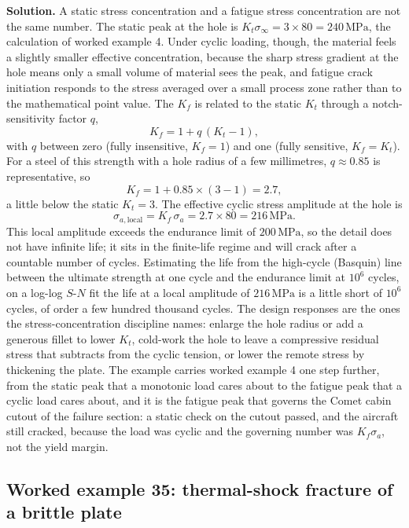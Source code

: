 \textbf{Solution.} A static stress concentration and a fatigue stress
concentration are not the same number. The static peak at the hole is
$K_t\sigma_\infty = 3\times 80 = 240\,\text{MPa}$, the calculation of worked
example 4. Under cyclic loading, though, the material feels a slightly smaller
effective concentration, because the sharp stress gradient at the hole means
only a small volume of material sees the peak, and fatigue crack initiation
responds to the stress averaged over a small process zone rather than to the
mathematical point value. The  $K_f$ is related
to the static $K_t$ through a notch-sensitivity factor $q$,
\[
K_f = 1 + q\,(K_t - 1),
\]
with $q$ between zero (fully insensitive, $K_f = 1$) and one (fully sensitive,
$K_f = K_t$). For a steel of this strength with a hole radius of a few
millimetres, $q \approx 0.85$ is representative, so
\[
K_f = 1 + 0.85\times(3 - 1) = 2.7,
\]
a little below the static $K_t = 3$. The effective cyclic stress amplitude at
the hole is
\[
\sigma_{a,\text{local}} = K_f\,\sigma_a = 2.7\times 80 = 216\,\text{MPa}.
\]
This local amplitude exceeds the endurance limit of $200\,\text{MPa}$, so the
detail does not have infinite life; it sits in the finite-life regime and will
crack after a countable number of cycles. Estimating the life from the
high-cycle (Basquin) line between the ultimate strength at one cycle and the
endurance limit at $10^6$ cycles, on a log-log $S$-$N$ fit the life at a local
amplitude of $216\,\text{MPa}$ is a little short of $10^6$ cycles, of order a
few hundred thousand cycles. The design responses are the ones the
stress-concentration discipline names: enlarge the hole radius or add a
generous fillet to lower $K_t$, cold-work the hole to leave a compressive
residual stress that subtracts from the cyclic tension, or lower the remote
stress by thickening the plate. The example carries worked example 4 one step
further, from the static peak that a monotonic load cares about to the fatigue
peak that a cyclic load cares about, and it is the fatigue peak that governs
the Comet cabin cutout of the failure section: a static check on the cutout
passed, and the aircraft still cracked, because the load was cyclic and the
governing number was $K_f\sigma_a$, not the yield margin.

\subsection*{Worked example 35: thermal-shock fracture of a brittle plate}

